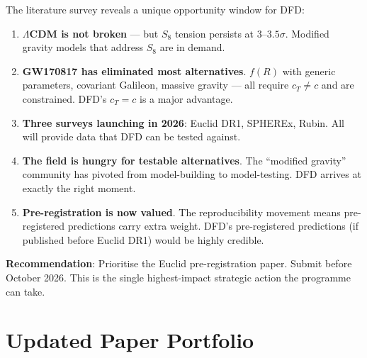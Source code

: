 \documentclass[11pt,a4paper]{article}
\begin{document}
The literature survey reveals a unique opportunity window for DFD:

\begin{enumerate}[nosep]
\item \textbf{$\Lambda$CDM is not broken} --- but $S_8$ tension persists at $3$--$3.5\sigma$. Modified gravity models that address $S_8$ are in demand.

\item \textbf{GW170817 has eliminated most alternatives}. $f(R)$ with generic parameters, covariant Galileon, massive gravity --- all require $c_T \neq c$ and are constrained. DFD's $c_T = c$ is a major advantage.

\item \textbf{Three surveys launching in 2026}: Euclid DR1, SPHEREx, Rubin. All will provide data that DFD can be tested against.

\item \textbf{The field is hungry for testable alternatives}. The ``modified gravity'' community has pivoted from model-building to model-testing. DFD arrives at exactly the right moment.

\item \textbf{Pre-registration is now valued}. The reproducibility movement means pre-registered predictions carry extra weight. DFD's pre-registered predictions (if published before Euclid DR1) would be highly credible.
\end{enumerate}

\textbf{Recommendation}: Prioritise the Euclid pre-registration paper. Submit before October 2026. This is the single highest-impact strategic action the programme can take.

\section{Updated Paper Portfolio}
\end{document}
